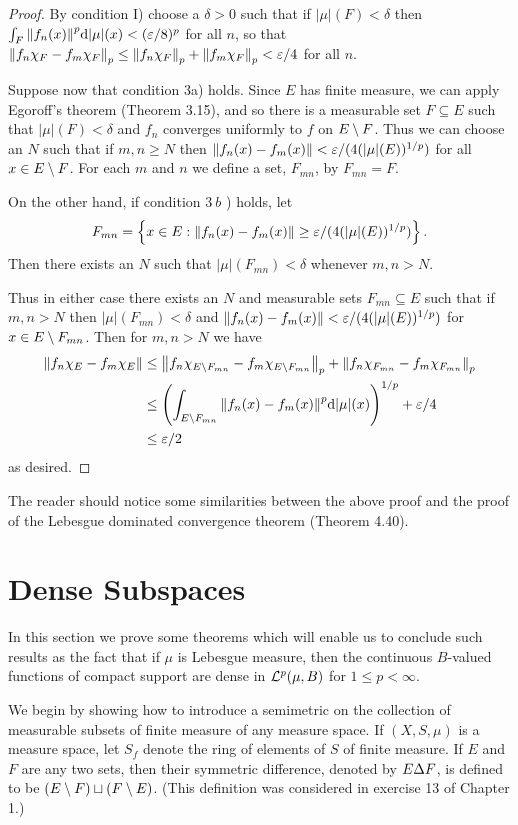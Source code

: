 \begin{proof}
By condition I) choose a $\delta>0$ such that if $|\mu|(F)<\delta$ then $\int_F\norm{f_n(x)}^p\dd|\mu|(x)<(\varepsilon/8)^p$ for all $n$, so that
$\norm{f_n\chi_{F}-f_m\chi_{F}}_p\leq\norm{f_n\chi_{F}}_p+\norm{f_m\chi_{F}}_p<\varepsilon/4$ for all $n$.

Suppose now that condition 3a) holds. Since $E$ has finite measure, we can apply Egoroff's theorem (Theorem 3.15), and so there is a measurable set $F\subseteq E$ such that $|\mu|(F)<\delta$ and $f_n$ converges uniformly to $f$ on $E\setminus F$. Thus we can choose an $N$ such that if $m,n\geq N$ then $\norm{f_n(x)-f_m(x)}<\varepsilon/(4(|\mu|(E))^{1/p})$ for all $x\in E\setminus F$. For each $m$ and $n$ we define a set, $F_{mn}$, by $F_{mn}=F$.

On the other hand, if condition $3 {~b}$ ) holds, let $$F_{mn}=\left\{x\in E:\norm{f_n(x)-f_m(x)}\geq\varepsilon/(4(|\mu|(E))^{1/p})\right\}.$$ Then there exists an $N$ such that $|\mu|(F_{mn})<\delta$ whenever $m, n>N$.

Thus in either case there exists an $N$ and measurable sets $F_{mn}\subseteq E$ such that if $m,n>N$ then $|\mu|(F_{mn})<\delta$ and $\norm{f_n(x)-f_m(x)}<\varepsilon/(4(|\mu|(E))^{1/p})$ for $x\in E\setminus F_{mn}$. Then for $m, n>N$ we have
\begin{align*}
    \norm{f_n\chi_{E}-f_m\chi_{E}}&\leq\norm{f_n\chi_{E\setminus F_{mn}}-f_m\chi_{E\setminus F_{mn}}}_p+\norm{f_n\chi_{F_{mn}}-f_m\chi_{F_{mn}}}_p\\
    &\leq\left(\int_{E\setminus F_{mn}}\norm{f_n(x)-f_m(x)}^p\dd|\mu|(x)\right)^{1/p}+\varepsilon/4\\
    &\leq\varepsilon/2
\end{align*}
as desired.
\end{proof}

The reader should notice some similarities between the above proof and the proof of the Lebesgue dominated convergence theorem (Theorem 4.40).

\section{Dense Subspaces}

In this section we prove some theorems which will enable us to conclude such results as the fact that if $\mu$ is Lebesgue measure, then the continuous $B$-valued functions of compact support are dense in ${\cal L}^p(\mu,B)$ for $1\leq p<\infty$.

We begin by showing how to introduce a semimetric on the collection of measurable subsets of finite measure of any measure space. If $(X,S,\mu)$ is a measure space, let $S_f$ denote the ring of elements of $S$ of finite measure. If $E$ and $F$ are any two sets, then their symmetric difference, denoted by $E \Delta F$, is defined to be $(E\setminus F)\sqcup(F\setminus E)$. (This definition was considered in exercise 13 of Chapter 1.)

